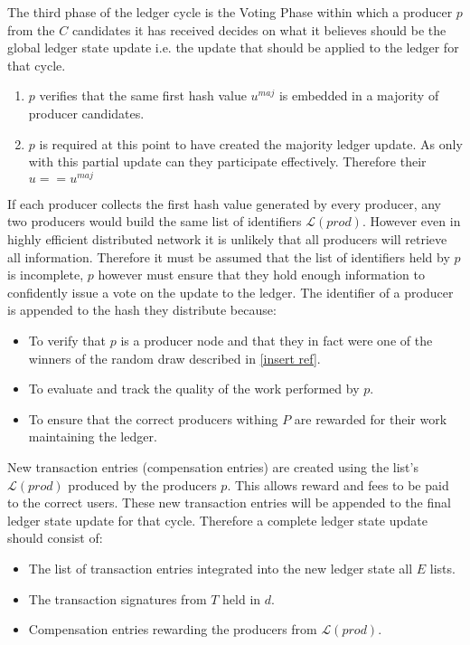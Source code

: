 The third phase of the ledger cycle is the Voting Phase within which a producer $p$ from the $C$ candidates it has received decides on what it believes should be the global ledger state update i.e. the update that should be applied to the ledger for that cycle.

\begin{enumerate}
\item $p$ verifies that the same first hash value $u^{maj}$ is embedded in a majority of producer candidates.
\item $p$ is required at this point to have created the majority ledger update. As only with this partial update can they participate effectively. Therefore their $u == u^{maj}$
\end{enumerate}

If each producer collects the first hash value generated by every producer, any two producers would build the same list of identifiers $\mathcal{L}(prod)$. However even in highly efficient distributed network it is unlikely that all producers will retrieve all information. Therefore it must be assumed that the list of identifiers held by $p$ is incomplete, $p$ however must ensure that they hold enough information to confidently issue a vote on the update to the ledger. The identifier of a producer is appended to the hash they distribute because:

\begin{itemize}
\item To verify that $p$ is a producer node and that they in fact were one of the winners of the random draw described in \ref{insert ref}.
\item To evaluate and track the quality of the work performed by $p$.
\item To ensure that the correct producers withing $P$ are rewarded for their work maintaining the ledger. \\

\end{itemize}

New transaction entries (compensation entries) are created using the list's  $\mathcal{L}(prod)$ produced by the producers $p$. This allows reward and fees to be paid to the correct users. These new transaction entries will be appended to the final ledger state update for that cycle. Therefore a complete ledger state update should consist of:

\begin{itemize}
\item The list of transaction entries integrated into the new ledger state all $E$ lists.
\item The transaction signatures from $T$ held in $d$.
\item Compensation entries rewarding the producers from $\mathcal{L}(prod)$.

\end{itemize}

